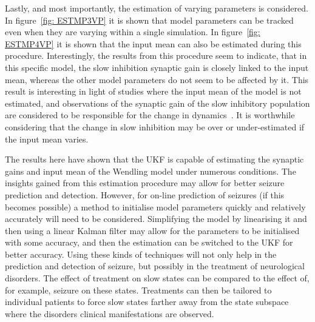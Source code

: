 Lastly, and most importantly, the estimation of varying parameters is considered. In figure~\ref{fig: ESTMP3VP} it is shown that model parameters can be tracked even when they are varying within a single simulation. In figure~\ref{fig: ESTMP4VP} it is shown that the input mean can also be estimated during this procedure. Interestingly, the results from this procedure seem to indicate, that in this specific model, the slow inhibition synaptic gain is closely linked to the input mean, whereas the other model parameters do not seem to be affected by it. This result is interesting in light of studies where the input mean of the model is not estimated, and observations of the synaptic gain of the slow inhibitory population are considered to be responsible for the change in dynamics~\citep{wendling2005interictal}. It is worthwhile considering that the change in slow inhibition may be over or under-estimated if the input mean varies.

The results here have shown that the UKF is capable of estimating the synaptic gains and input mean of the Wendling model under numerous conditions. The insights gained from this estimation procedure may allow for better seizure prediction and detection. However, for on-line prediction of seizures (if this becomes possible) a method to initialise model parameters quickly and relatively accurately will need to be considered. Simplifying the model by linearising it and then using a linear Kalman  filter may allow for the parameters to be initialised with some accuracy, and then the estimation can be switched to the UKF for better accuracy. Using these kinds of techniques will not only help in the prediction and detection of seizure, but possibly in the treatment of neurological disorders. The effect of treatment on slow states can be compared to the effect of, for example, seizure on these states. Treatments can then be tailored to individual patients to force slow states farther away from the state subspace where the disorders clinical manifestations are observed.
